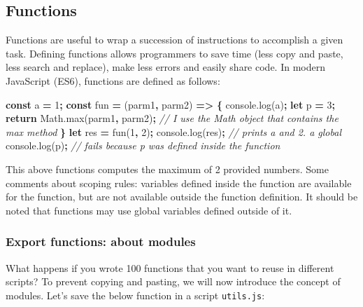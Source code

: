 \documentclass[]{book}
\newenvironment{Shaded}{\begin{snugshade}}{\end{snugshade}}
\newcommand{\AttributeTok}[1]{\textcolor[rgb]{0.77,0.63,0.00}{#1}}
\newcommand{\CommentTok}[1]{\textcolor[rgb]{0.56,0.35,0.01}{\textit{#1}}}
\newcommand{\ControlFlowTok}[1]{\textcolor[rgb]{0.13,0.29,0.53}{\textbf{#1}}}
\newcommand{\DecValTok}[1]{\textcolor[rgb]{0.00,0.00,0.81}{#1}}
\newcommand{\KeywordTok}[1]{\textcolor[rgb]{0.13,0.29,0.53}{\textbf{#1}}}
\newcommand{\NormalTok}[1]{#1}
\newcommand{\OperatorTok}[1]{\textcolor[rgb]{0.81,0.36,0.00}{\textbf{#1}}}
\newcommand{\VariableTok}[1]{\textcolor[rgb]{0.00,0.00,0.00}{#1}}
\begin{document}
\hypertarget{functions}{%
\subsection{Functions}\label{functions}}

Functions are useful to wrap a succession of instructions to accomplish a given task. Defining functions allows programmers to save time (less copy and paste, less search and replace), make less errors and easily share code. In modern JavaScript (ES6), functions are defined as follows:

\begin{Shaded}
\begin{Highlighting}[]
\KeywordTok{const}\NormalTok{ a }\OperatorTok{=} \DecValTok{1}\OperatorTok{;}
\KeywordTok{const}\NormalTok{ fun }\OperatorTok{=}\NormalTok{ (parm1}\OperatorTok{,}\NormalTok{ parm2) }\OperatorTok{=>} \OperatorTok{\{}
  \VariableTok{console}\NormalTok{.}\AttributeTok{log}\NormalTok{(a)}\OperatorTok{;}
  \KeywordTok{let}\NormalTok{ p }\OperatorTok{=} \DecValTok{3}\OperatorTok{;}
  \ControlFlowTok{return} \VariableTok{Math}\NormalTok{.}\AttributeTok{max}\NormalTok{(parm1}\OperatorTok{,}\NormalTok{ parm2)}\OperatorTok{;} \CommentTok{// I use the Math object that contains the max method}
\OperatorTok{\}}
\KeywordTok{let}\NormalTok{ res }\OperatorTok{=} \AttributeTok{fun}\NormalTok{(}\DecValTok{1}\OperatorTok{,} \DecValTok{2}\NormalTok{)}\OperatorTok{;}
\VariableTok{console}\NormalTok{.}\AttributeTok{log}\NormalTok{(res)}\OperatorTok{;} \CommentTok{// prints a and 2. a global}
\VariableTok{console}\NormalTok{.}\AttributeTok{log}\NormalTok{(p)}\OperatorTok{;} \CommentTok{// fails because p was defined inside the function}
\end{Highlighting}
\end{Shaded}

This above functions computes the maximum of 2 provided numbers. Some comments about scoping rules: variables defined inside the function are available for the function, but are not available outside the function definition. It should be noted that functions may use global variables defined outside of it.

\hypertarget{export-functions-about-modules}{%
\subsubsection{Export functions: about modules}\label{export-functions-about-modules}}

What happens if you wrote 100 functions that you want to reuse in different scripts? To prevent copying and pasting, we will now introduce the concept of modules. Let's save the below function in a script \texttt{utils.js}:
\end{document}
